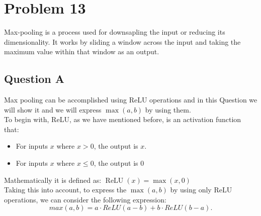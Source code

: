 \section{Problem 13}
Max-pooling is a process used for downsapling the input or reducing its dimensionality. It works by sliding a window across the input and taking the maximum value within that window as an output.

\subsection{Question A}
Max pooling can be accomplished using ReLU operations and in this Question we will show it and we will express $\max(a,b)$ by using them.\\

To begin with, ReLU, as we have mentioned before, is an activation function that:
\begin{itemize}
	\item For inputs $x$ where $x > 0$, the output is $x$.
	\item For inputs $x$ where $x \leq 0$, the output is $0$
\end{itemize}

Mathematically it is defined as: $\operatorname{ReLU}(x)=\operatorname*{max}(x,0)$\\

Taking this into account, to express the $\max(a,b)$ by using only ReLU operations, we can consider the following expression:\\
\begin{equation}
	max(a,b) = a \cdot ReLU(a-b) + b \cdot ReLU(b-a).
	\label{eq:problem13}
\end{equation}


